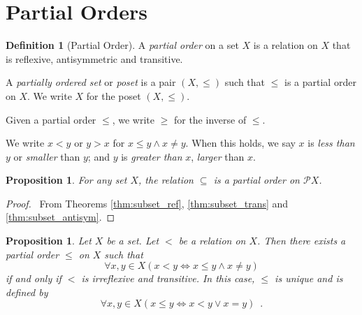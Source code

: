 \documentclass{report}
\let\qed\relax
\newtheorem{prop}[ax]{Proposition}
\theoremstyle{definition}
\newtheorem{df}[ax]{Definition}
\begin{document}
\section{Partial Orders}

\begin{df}[Partial Order]
A \emph{partial order} on a set $X$ is a relation on $X$ that is reflexive, antisymmetric and transitive.

A \emph{partially ordered set} or \emph{poset} is a pair $(X, \leq)$ such that $\leq$ is a partial order on $X$.
We write $X$ for the poset $(X, \leq)$.

Given a partial order $\leq$, we write $\geq$ for the inverse of $\leq$.

We write $x < y$ or $y > x$ for $x \leq y \wedge x \neq y$. When this holds, we say $x$ is \emph{less than} $y$ or \emph{smaller} than $y$; and $y$ is \emph{greater than} $x$, \emph{larger} than $x$.
\end{df}

\begin{prop}
For any set $X$, the relation $\subseteq$ is a partial order on $\mathcal{P} X$.
\end{prop}

\begin{proof}
\pf\ From Theorems \ref{thm:subset_ref}, \ref{thm:subset_trans} and \ref{thm:subset_antisym}. \qed
\end{proof}

\begin{prop}
Let $X$ be a set. Let $<$ be a relation on $X$. Then there exists a partial order $\leq$ on $X$ such that
\[ \forall x,y \in X (x < y \Leftrightarrow x \leq y \wedge x \neq y) \]
if and only if $<$ is irreflexive and transitive. In this case, $\leq$ is unique and is defined by
\[ \forall x,y \in X (x \leq y \Leftrightarrow x < y \vee x = y) \enspace . \]
\end{prop}
\end{document}
